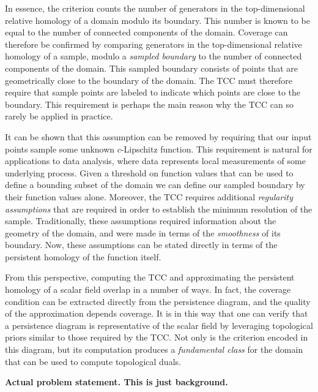 
In essence, the criterion counts the number of generators in the top-dimensional relative homology of a domain modulo its boundary.
This number is known to be equal to the number of connected components of the domain.
Coverage can therefore be confirmed by comparing generators in the top-dimensional relative homology of a sample, modulo a \emph{sampled boundary} to the number of connected components of the domain.
This sampled boundary consists of points that are geometrically close to the boundary of the domain.
The TCC must therefore require that sample points are labeled to indicate which points are close to the boundary.
This requirement is perhaps the main reason why the TCC can so rarely be applied in practice.

It can be shown that this assumption can be removed by requiring that our input points sample some unknown $c$-Lipschitz function.
This requirement is natural for applications to data analysis, where data represents local measurements of some underlying process.
Given a threshold on function values that can be used to define a bounding subset of the domain we can define our sampled boundary by their function values alone.
Moreover, the TCC requires additional \emph{regularity assumptions} that are required in order to establish the minimum resolution of the sample.
Traditionally, these assumptions required information about the geometry of the domain, and were made in terms of the \emph{smoothness} of its boundary.
Now, these assumptions can be stated directly in terms of the persistent homology of the function itself.

From this perspective, computing the TCC and approximating the persistent homology of a scalar field overlap in a number of ways.
In fact, the coverage condition can be extracted directly from the persistence diagram, and the quality of the approximation depends coverage.
It is in this way that one can verify that a persistence diagram is representative of the scalar field by leveraging topological priors similar to those required by the TCC.
Not only is the criterion encoded in this diagram, but its computation produces a \emph{fundamental class} for the domain that can be used to compute topological duals.


\textbf{Actual problem statement. This is just background.}
